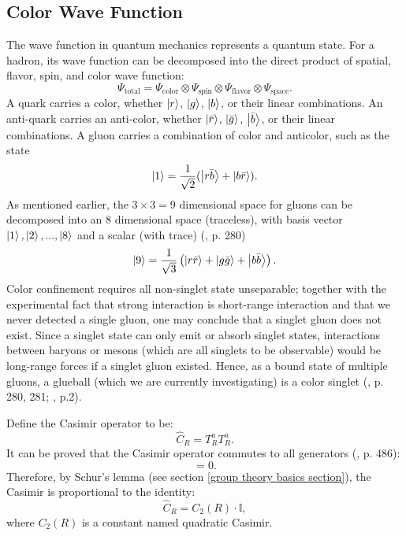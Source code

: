 \documentclass[12pt]{article}
\begin{document}
	\subsection{Color Wave Function}
	The wave function in quantum mechanics represents a quantum state. For a hadron, its wave function can be decomposed into the direct product of spatial, flavor, spin, and color wave function: 
	\begin{equation}
		\Psi_{\text{total}} = \Psi_{\text{color}} \otimes \Psi_{\text{spin}}\otimes \Psi_{\text{flavor}} \otimes \Psi_{\text{space}}.
	\end{equation}
	A quark carries a color, whether $\ket{r}$, $\ket{g}$, $\ket{b}$, or their linear combinations. An anti-quark carries an anti-color, whether $\ket{\bar r}$, $\ket{\bar g}$, $\ket{\bar b}$, or their linear combinations. A gluon carries a combination of color and anticolor, such as the state
	\begin{equation}
		\ket{1} = \frac{1}{\sqrt{2}}(\ket{r\bar b} + \ket{b \bar r}).
	\end{equation}
	As mentioned earlier, the $3 \times 3 = 9$ dimensional space for gluons can be decomposed into an $8$ dimensional space (traceless), with basis vector $\ket{1}, \ket{2},...,\ket{8}$ and a scalar (with trace) (\cite{griffiths1987IEP}, p. 280)
	\begin{equation}
		\ket{9} = \frac{1}{\sqrt{3}}\left( \ket{r\bar r} + \ket{g \bar g} + \ket{b \bar b}\right). \label{singlet config}
	\end{equation} Color confinement requires all non-singlet state unseparable; together with the experimental fact that strong interaction is short-range interaction and that we never detected a single gluon, one may conclude that a singlet gluon does not exist. Since a singlet state can only emit or absorb singlet states, interactions between baryons or mesons (which are all singlets to be observable) would be long-range forces if a singlet gluon existed. Hence, as a bound state of multiple gluons, a glueball (which we are currently investigating) is a color singlet (\cite{griffiths1987IEP}, p. 280, 281; \cite{glueballhunting}, p.2).
	
	
	Define the Casimir operator to be:
	\begin{equation}
		\hat{C}_R = T^a_R T^a_R.
	\end{equation}
	It can be proved that the Casimir operator commutes to all generators (\cite{schwartz1}, p. 486):
	\begin{equation}
		[\hat{C}_R, T^b_R] = 0.
	\end{equation}
	Therefore, by Schur's lemma (see section \ref{group theory basics section}), the Casimir is proportional to the identity:
	\begin{equation}
		\hat{C}_R = C_2(R)\cdot\mathbb{I},
	\end{equation}
	where $C_2(R)$ is a constant named quadratic Casimir. 
	
\end{document}
